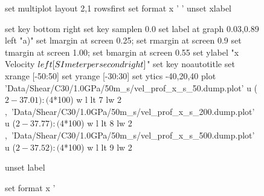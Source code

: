 \documentclass[aps,prb,reprint,superscriptaddress, a4paper]{revtex4-1}
\begin{document}
\begin{figure}
    	\begin{center}
		\begin{gnuplot}[terminal=pdf, terminaloptions={size \SERFigwidth cm, \SERFigheight cm color solid}]
			set multiplot layout 2,1 rowsfirst
			set format x ' '
			unset xlabel

			set key bottom right
			set key samplen  0.0
			set label at graph 0.03,0.89 left "a)"
			set lmargin at screen 0.25; set rmargin at screen 0.9
			set tmargin at screen 1.00; set bmargin at screen 0.55
			set ylabel "x Velocity $\\left[ \\SI{}{\\meter\\per\\second} \\right]$"
			set key noautotitle
			set xrange [-50:50]
			set yrange [-30:30]
			set ytics -40,20,40
			plot  	'Data/Shear/C30/1.0GPa/50m_s/vel_prof_x_s_50.dump.plot' u ($2-37.01):($4*100) w l  lt 7 lw 2  ,\
					'Data/Shear/C30/1.0GPa/50m_s/vel_prof_x_s_200.dump.plot' u ($2-37.77):($4*100) w l  lt 8 lw 2  ,\
					'Data/Shear/C30/1.0GPa/50m_s/vel_prof_x_s_500.dump.plot' u ($2-37.52):($4*100) w l  lt 9 lw 2  
					
			unset label

			set format x '%


\end{gnuplot}
\end{center}
\end{figure}
\end{document}
